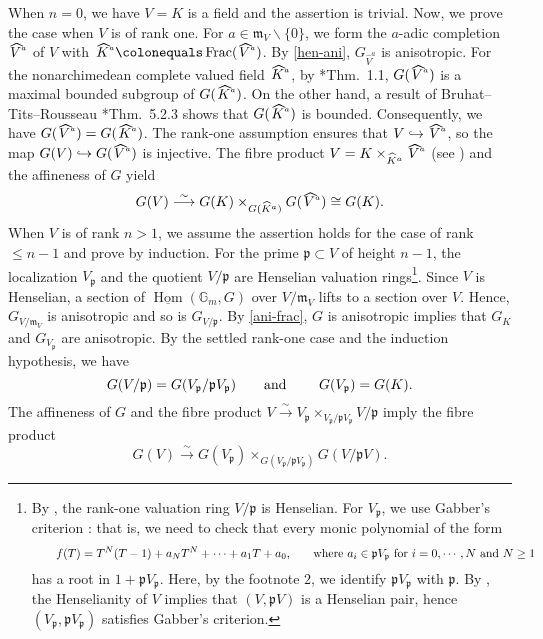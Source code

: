 \documentclass[a4paper,11pt,reqno]{amsart}
\newcommand{\bG}{\mathbb{G}}
\newcommand{\fm}{\mathfrak{m}}
\newcommand{\fp}{\mathfrak{p}}
\newcommand{\hra}{\hookrightarrow}
\newcommand{\wh}{\widehat}
\newcommand{\ce}{\colonequals}
\newcommand{\un}{\underline}
\newcommand{\isoto}{\overset{\sim}{\longrightarrow}}
\newcommand{\hva}{\!\stackon[-8pt]{\;$V^{\raisebox{1pt}{$\mathsmaller{\mathsmaller{a}}$}}$}{\vstretch{1.5}{\hstretch{1.7}{\widehat{\phantom{}}}}}}
\newcommand{\hka}{\!\stackon[-8pt]{\;$K^{\raisebox{1pt}{$\mathsmaller{\mathsmaller{a}}$}}$}{\vstretch{1.5}{\hstretch{1.7}{\widehat{\phantom{}}}}}}
\newcommand{\nhka}{\wh{K}^a}
\newcommand{\nhva}{\wh{V}^a}
\providecommand{\SP}[1]{\cite[\href{https://stacks.math.columbia.edu/tag/#1}{#1}]{SP}}
\DeclareMathOperator{\Hom}{Hom}			                       %
\DeclareMathOperator{\Frac}{Frac}		                       %
\newcommand{\qq}{\quad\quad}
\newcommand{\tst}{\textstyle}
\theoremstyle{plain}
\theoremstyle{remark}
\theoremstyle{definition}
\theoremstyle{plain}
\theoremstyle{definition}
\theoremstyle{subsection-tweak}
\theoremstyle{subsection-tweak}
\numberwithin{equation}{subsection}
\begin{document}
      When $n=0$, we have $V=K$ is a field and the assertion is trivial.
      Now, we prove the case when $V$ is of rank one.
      For $a\in \fm_{V}\backslash\{0\}$, we form the $a$-adic completion $\hva$ of $V$ with $\hka\ce \Frac(\hva)$.
      By \ref{hen-ani}, $G_{\nhva}$ is anisotropic.
      For the nonarchimedean complete valued field $\hka$, by \cite{Mac17}*{Thm.~1.1}, $G(\hva)$ is a maximal bounded subgroup of $G(\hka)$.
      On the other hand, a result of Bruhat--Tits--Rousseau \cite{Rou77}*{Thm.~5.2.3} shows that $G(\hka)$ is bounded.
      Consequently, we have $G(\hva)=G(\hka)$.
      The rank-one assumption ensures that $V\hookrightarrow \hva$, so the map $G(V)\hra G(\hva)$ is injective.
      The fibre product $V=K\times_{\nhka}\hva$ (see \SP{0BNR}) and the affineness of $G$ yield
      \[
      \tst G(V)\isoto G(K)\times_{G(\nhka)}G(\hva)\cong G(K). 
      \]
      When $V$ is of rank $n>1$, we assume the assertion holds for the case of rank $\leq n-1$ and prove by induction.
      For the prime $\fp\subset V$ of height $n-1$, the localization $V_{\fp}$ and the quotient $V/\fp$ are Henselian valuation rings\footnote{By \SP{05WQ}, the rank-one valuation ring $V/\fp$ is Henselian.  
      For $V_{\fp}$, we use Gabber's criterion \SP{09XI}: that is, we need to check that every monic polynomial of the form
      \[
      \text{\qq $f(T)=T^N(T-1)+a_NT^N+\cdots+a_1T+a_0$,\qq where $a_{i}\in \fp V_{\fp}$ for $i=0,\cdots, N$ and $N\geq 1$}
      \]       
      has a root in $1+\fp V_{\fp}$. 
      Here, by the footnote $2$, we identify $\fp V_{\fp}$ with $\fp$.
      By \SP{0DYD}, the Henselianity of $V$ implies that $(V,\fp V)$ is a Henselian pair, hence $(V_{\fp}, \fp V_{\fp})$ satisfies Gabber's criterion.}. 
      Since $V$ is Henselian, a section of $\un{\Hom}(\bG_m, G)$ over $V/\fm_{V}$ lifts to a section over $V$.
      Hence, $G_{V/\fm_V}$ is anisotropic and so is $G_{V/\fp}$.
      By \ref{ani-frac}, $G$ is anisotropic implies that $G_{K}$ and $G_{V_{\fp}}$ are anisotropic. 
      By the settled rank-one case and the induction hypothesis, we have 
      \begin{equation}\label{ani-one}
       \text{$G(V/\fp)=G(V_{\fp}/\fp V_{\fp})$\qq and \qq $G(V_{\fp})=G(K)$.}
      \end{equation}
      The affineness of $G$ and the fibre product $V\isoto V_{\fp}\times_{V_{\fp}/\fp V_{\fp}}V/\fp$ imply the fibre product
      \begin{equation}\label{ani-fib-pro}
            G(V)\isoto G(V_{\fp})\times_{G(V_{\fp}/\fp V_{\fp})} G(V/\fp V).
      \end{equation}
\end{document}
